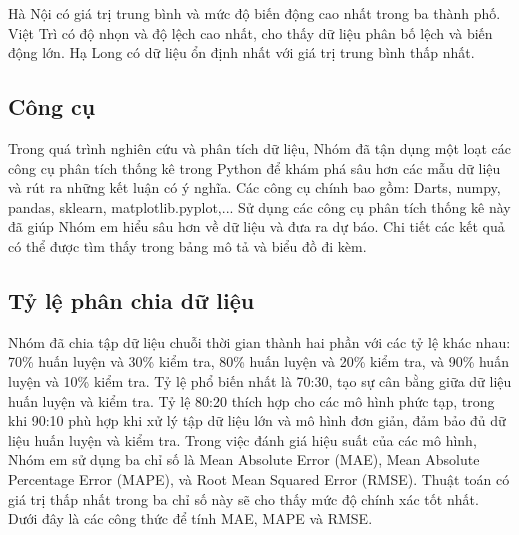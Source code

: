 

Hà Nội có giá trị trung bình và mức độ biến động cao nhất trong ba thành phố. Việt Trì có độ nhọn và độ lệch cao nhất, cho thấy dữ liệu phân bố lệch và biến động lớn. Hạ Long có dữ liệu ổn định nhất với giá trị trung bình thấp nhất.


\subsection{Công cụ}
Trong quá trình nghiên cứu và phân tích dữ liệu, Nhóm đã tận dụng một loạt các công cụ phân tích thống kê trong Python để khám phá sâu hơn các mẫu dữ liệu và rút ra những kết luận có ý nghĩa. Các công cụ chính bao gồm: Darts, numpy, pandas, sklearn, matplotlib.pyplot,... Sử dụng các công cụ phân tích thống kê này đã giúp Nhóm em hiểu sâu hơn về dữ liệu và đưa ra dự báo. Chi tiết các kết quả có thể được tìm thấy trong bảng mô tả và biểu đồ đi kèm. 

\subsection{Tỷ lệ phân chia dữ liệu}
Nhóm đã chia tập dữ liệu chuỗi thời gian thành hai phần với các tỷ lệ khác nhau: 70\% huấn luyện và 30\% kiểm tra, 80\% huấn luyện và 20\% kiểm tra, và 90\% huấn luyện và 10\% kiểm tra. Tỷ lệ phổ biến nhất là 70:30, tạo sự cân bằng giữa dữ liệu huấn luyện và kiểm tra. Tỷ lệ 80:20 thích hợp cho các mô hình phức tạp, trong khi 90:10 phù hợp khi xử lý tập dữ liệu lớn và mô hình đơn giản, đảm bảo đủ dữ liệu huấn luyện và kiểm tra. Trong việc đánh giá hiệu suất của các mô hình, Nhóm em sử dụng ba chỉ số là Mean Absolute Error (MAE), Mean Absolute Percentage Error (MAPE), và Root Mean Squared Error (RMSE). Thuật toán có giá trị thấp nhất trong ba chỉ số này sẽ cho thấy mức độ chính xác tốt nhất. Dưới đây là các công thức để tính MAE, MAPE và RMSE.

